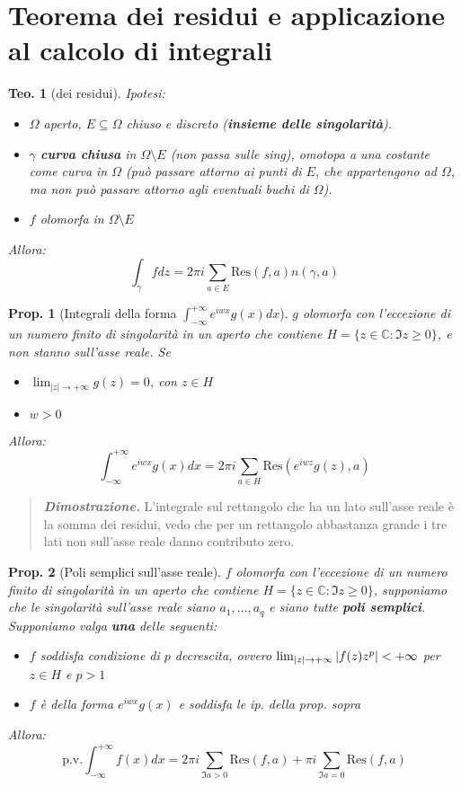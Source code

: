 \documentclass[a4paper,10pt]{article}
\newcommand{\im}{\mathbb{C}} %
\theoremstyle{indentdefinition}
\theoremstyle{indenttheorem}
\newtheorem{thm}{Teo.}
\newtheorem{prop}{Prop.}
\theoremstyle{myremark}
\theoremstyle{indentgeneral}
\newenvironment{dimo}{\begin{quote}\textit{\textbf{Dimostrazione.}}}{\end{quote}} %
\begin{document}
\section{Teorema dei residui e applicazione al calcolo di integrali}
\begin{thm}[dei residui] Ipotesi:
\begin{itemize}
    \item $\Omega$ aperto, $E\subseteq\Omega$ chiuso e discreto (\textbf{insieme delle singolarità}).
    \item  $\gamma$ \textbf{curva chiusa} in $\Omega\setminus E$ (non passa sulle sing), omotopa a una costante come curva in $\Omega $ (può passare attorno ai punti di $E$, che appartengono ad $\Omega$, ma non può passare attorno agli eventuali buchi di $\Omega$).
    \item $f$ olomorfa in $\Omega\setminus E$
\end{itemize}
Allora:
$$\int_\gamma fdz=2\pi i\sum_{a\in E}\text{Res}(f,a)n(\gamma,a)$$
    
\end{thm}
\begin{prop}[Integrali della forma $\int_{-\infty}^{+\infty}e^{iwx}g(x)dx$]
    $g$ olomorfa con l'eccezione di un numero finito di singolarità in un aperto che contiene $H=\{z\in\im:\Im z\ge0\}$, e non stanno sull'asse reale. Se
    \begin{itemize}
        \item $\lim_{|z|\to+\infty}g(z)=0$, con $z\in H$
        \item $w>0$
    \end{itemize}
    Allora:
    $$\int_{-\infty}^{+\infty}e^{iwx}g(x)dx=2\pi i\sum_{a\in H}\text{Res}(e^{iwz}g(z),a)$$
\end{prop}
\begin{dimo}
    L'integrale sul rettangolo che ha un lato sull'asse reale è la somma dei residui, vedo che per un rettangolo abbastanza grande i tre lati non sull'asse reale danno contributo zero.
\end{dimo}
\begin{prop}[Poli semplici sull'asse reale]
$f$ olomorfa con l'eccezione di un numero finito di singolarità in un aperto che contiene $H=\{z\in\im:\Im z\ge0\}$, supponiamo che le singolarità sull'asse reale siano $a_1,\dots,a_q$ e siano tutte \textbf{poli semplici}. Supponiamo valga \textbf{una} delle seguenti:
\begin{itemize}
    \item $f$  soddisfa condizione di $p$ decrescita, 
 ovvero $\lim_{|z|\to+\infty}\abs{f(z)z^p}<+\infty$ per $z\in H$ e $p>1$
 \item $f$ è della forma $e^{iwx}g(x)$ e soddisfa le ip. della prop. sopra
\end{itemize}
    Allora:
    $$\text{p.v.}\int_{-\infty}^{+\infty}f(x)dx=2\pi i\sum_{\Im a>0}\text{Res}(f,a)+\pi i\sum_{\Im a=0}\text{Res}(f,a)$$
\end{prop}
\end{document}
